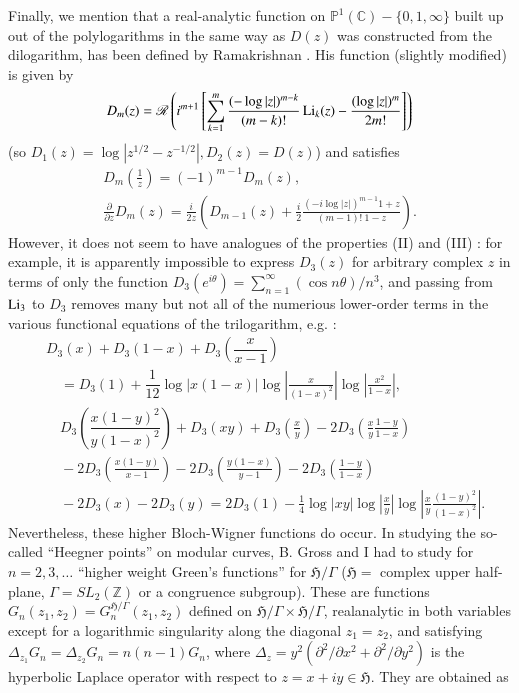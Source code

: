 Finally, we mention that a real-analytic function on $\mathbb{P}^{1}(\mathbb{C})-\{0,1,\infty\}$ built up out of the polylogarithms in the same way as $D(z)$ was constructed from the dilogarithm, has been defined by Ramakrishnan \cite{art15-key6}. His function (slightly modified) is given by
$$
D_{m}(z)=\mathscr{R}\left(i^{m+1}\left[\sum\limits^{m}_{k=1}\frac{(-\log |z|)^{m-k}}{(m-k)!}\operatorname{Li}_{k}(z)-\frac{(\log |z|)^{m}}{2m!}\right]\right)
$$
(so $D_{1}(z)=\log |z^{1/2}-z^{-1/2}|, D_{2}(z)=D(z)$) and satisfies 
\begin{gather*}
D_{m}\left(\frac{1}{z}\right)=(-1)^{m-1}D_{m}(z),\\
\frac{\partial}{\partial z}D_{m}(z)=\frac{i}{2z}\left(D_{m-1}(z)+\frac{i}{2}\frac{(-i\log |z|)^{m-1}1+z}{(m-1)! \ 1-z}\right).
\end{gather*}
However, it does not seem to have analogues of the properties (II) and (III) : for example, it is apparently impossible to express $D_{3}(z)$ for arbitrary complex $z$ in terms of only the function $D_{3}(e^{i\theta})=\sum^{\infty}_{n=1}(\cos n\theta)/n^{3}$, and passing from $\operatorname{Li}_{3}$ to $D_{3}$ removes many but not all of the numerious lower-order terms in the various functional equations of the trilogarithm, e.g. :
\begin{align*}
& D_{3}(x)+D_{3}(1-x)+D_{3}\left(\dfrac{x}{x-1}\right)\\
&\quad =D_{3}(1)+\dfrac{1}{12}\log |x(1-x)|\log \left|\frac{x}{(1-x)^{2}}\right|\log \left|\frac{x^{2}}{1-x}\right|,\\
&\quad D_{3}\left(\dfrac{x(1-y)^{2}}{y(1-x)^{2}}\right)+D_{3}(xy)+D_{3}\left(\frac{x}{y}\right)-2D_{3}\left(\frac{x}{y}\frac{1-y}{1-x}\right)\\
&\quad {}-2D_{3}\left(\frac{x(1-y)}{x-1}\right)-2D_{3}\left(\frac{y(1-x)}{y-1}\right)-2D_{3}\left(\frac{1-y}{1-x}\right)\\
&\quad {}-2D_{3}(x)-2D_{3}(y)=2D_{3}(1)-\frac{1}{4}\log |xy|\log\left|\frac{x}{y}\right|\log \left|\frac{x}{y}\frac{(1-y)^{2}}{(1-x)^{2}}\right|.
\end{align*}\pageoriginale
Nevertheless, these higher Bloch-Wigner functions do occur. In studying the so-called ``Heegner points'' on modular curves, B. Gross and I had to study for $n=2,3,\ldots$ ``higher weight Green's functions'' for $\mathfrak{H}/\Gamma$ ($\mathfrak{H}=$ complex upper half-plane, $\Gamma=SL_{2}(\mathbb{Z})$ or a congruence subgroup). These are functions $G_{n}(z_{1},z_{2})=G^{\mathfrak{H}/\Gamma}_{n}(z_{1},z_{2})$ defined on $\mathfrak{H}/\Gamma\times \mathfrak{H}/\Gamma$, realanalytic in both variables except for a logarithmic singularity along the diagonal $z_{1}=z_{2}$, and satisfying $\Delta_{z_{1}}G_{n}=\Delta_{z_{2}}G_{n}=n(n-1)G_{n}$, where $\Delta_{z}=y^{2}(\partial^{2}/\partial x^{2}+\partial^{2}/\partial y^{2})$ is the hyperbolic Laplace operator with respect to $z=x+iy \in \mathfrak{H}$. They are obtained as
